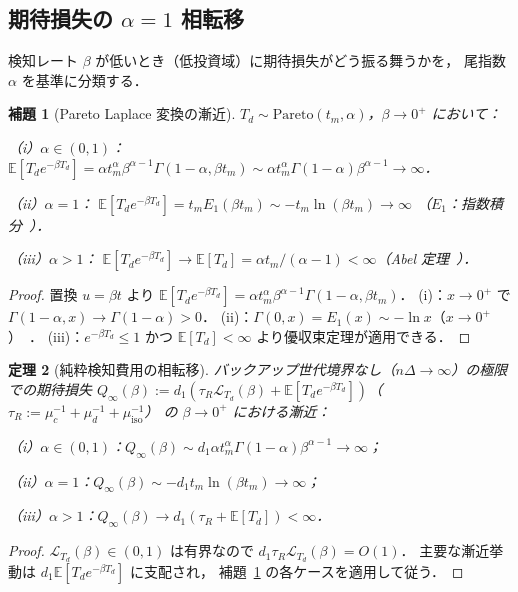 \documentclass[12pt,a4paper]{article}
\theoremstyle{plain}
\newtheorem{theorem}{定理}[section]
\newtheorem{lemma}[theorem]{補題}
\theoremstyle{definition}
\theoremstyle{remark}
\newcommand{\E}{\mathbb{E}}
\newcommand{\calL}{\mathcal{L}}
\newcommand{\Qinf}{Q_{\infty}}
\begin{document}
\subsection{期待損失の $\alpha=1$ 相転移}

検知レート $\beta$ が低いとき（低投資域）に期待損失がどう振る舞うかを，
尾指数 $\alpha$ を基準に分類する．

\begin{lemma}[Pareto Laplace 変換の漸近]\label{lem:laplace}
$T_d\sim\mathrm{Pareto}(t_m,\alpha)$，$\beta\to0^+$ において：

\noindent（i）$\alpha\in(0,1)$：
$\E[T_d e^{-\beta T_d}]=\alpha t_m^\alpha\beta^{\alpha-1}\Gamma(1-\alpha,\beta t_m)
\sim\alpha t_m^\alpha\Gamma(1-\alpha)\beta^{\alpha-1}\to\infty$．

\noindent（ii）$\alpha=1$：
$\E[T_d e^{-\beta T_d}]=t_m E_1(\beta t_m)\sim-t_m\ln(\beta t_m)\to\infty$
（$E_1$：指数積分~\cite{abramowitz1965}）．

\noindent（iii）$\alpha>1$：
$\E[T_d e^{-\beta T_d}]\to\E[T_d]=\alpha t_m/(\alpha-1)<\infty$（Abel 定理~\cite{feller1971}）．
\end{lemma}

\begin{proof}
置換 $u=\beta t$ より
$\E[T_d e^{-\beta T_d}]=\alpha t_m^\alpha\beta^{\alpha-1}\Gamma(1-\alpha,\beta t_m)$．
(i)：$x\to0^+$ で $\Gamma(1-\alpha,x)\to\Gamma(1-\alpha)>0$．
(ii)：$\Gamma(0,x)=E_1(x)\sim-\ln x$（$x\to0^+$）~\cite{abramowitz1965}．
(iii)：$e^{-\beta T_d}\le1$ かつ $\E[T_d]<\infty$ より優収束定理が適用できる．
\end{proof}

\begin{theorem}[純粋検知費用の相転移]\label{thm:q_inf}
バックアップ世代境界なし（$n\Delta\to\infty$）の極限での期待損失
$\Qinf(\beta):=d_1(\tau_R\calL_{T_d}(\beta)+\E[T_d e^{-\beta T_d}])$（$\tau_R:=\mu_c^{-1}+\mu_d^{-1}+\mu_{\mathrm{iso}}^{-1}$）
の $\beta\to0^+$ における漸近：

\noindent（i）$\alpha\in(0,1)$：$\Qinf(\beta)\sim d_1\alpha t_m^\alpha\Gamma(1-\alpha)\beta^{\alpha-1}\to\infty$；

\noindent（ii）$\alpha=1$：$\Qinf(\beta)\sim-d_1 t_m\ln(\beta t_m)\to\infty$；

\noindent（iii）$\alpha>1$：$\Qinf(\beta)\to d_1(\tau_R+\E[T_d])<\infty$．
\end{theorem}

\begin{proof}
$\calL_{T_d}(\beta)\in(0,1)$ は有界なので $d_1\tau_R\calL_{T_d}(\beta)=O(1)$．
主要な漸近挙動は $d_1\E[T_d e^{-\beta T_d}]$ に支配され，
補題~\ref{lem:laplace} の各ケースを適用して従う．
\end{proof}
\end{document}
